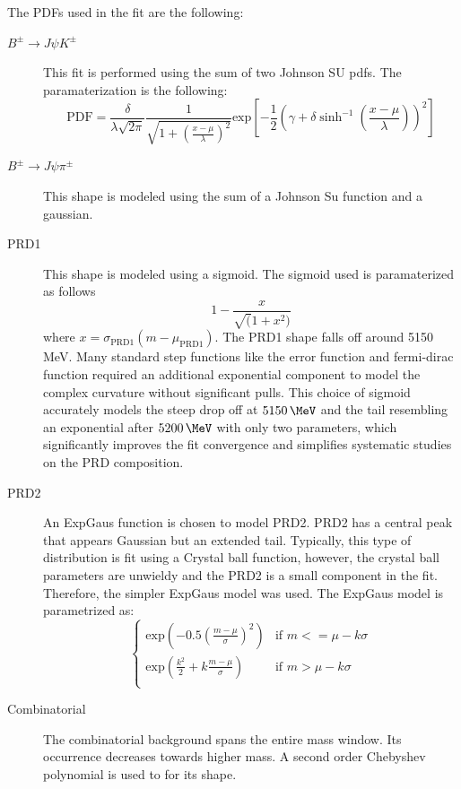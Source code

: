 The PDFs used in the fit are the following:
\begin{description}
\item [$B^{\pm}\to J\psi K^\pm$] This fit is performed using the sum of two Johnson SU pdfs. The paramaterization is the following: 
\begin{equation}
    \text{PDF} = \frac{\delta}{\lambda \sqrt{2\pi}} \frac{1}{\sqrt{1+(\frac{x-\mu}{\lambda})^2}} \text{exp}[-\frac{1}{2}(\gamma + \delta \sinh ^{-1}(\frac{x-\mu}{\lambda}))^2]
\end{equation}

\item[$B^{\pm}\to J\psi \pi^\pm$] This shape is modeled using the sum of a Johnson Su function and a gaussian. 

\item[PRD1] This shape is modeled using a sigmoid. The sigmoid used is paramaterized as follows
\begin{equation}
    1-\frac{x}{\sqrt(1+x^2)}%
\end{equation}
where $x = \sigma_{\text{PRD1}} (m-\mu_{\text{PRD1}})$. The PRD1 shape falls off around 5150 MeV. Many standard step functions like the error function and fermi-dirac function required an additional exponential component to model the complex curvature without significant pulls. This choice of sigmoid accurately models the steep drop off at $5150\,\MeV$ and the tail resembling an exponential after $5200\,\MeV$ with only two parameters, which significantly improves the fit convergence and simplifies systematic studies on the PRD composition. 

\item[PRD2] An ExpGaus \cite{expgauss} function is chosen to model PRD2. PRD2 has a central peak that appears Gaussian but an extended tail. Typically, this type of distribution is fit using a Crystal ball function, however, the crystal ball parameters are unwieldy and the PRD2 is a small component in the fit. Therefore, the simpler ExpGaus model was used. The ExpGaus model is parametrized as:
\begin{equation}
    \begin{cases}
        \text{exp}(-0.5(\frac{m-\mu}{\sigma})^2) & \text{if } m <= \mu-k\sigma \\
        \text{exp}(\frac{k^2}{2} + k\frac{m-\mu}{\sigma}) & \text{if } m > \mu-k\sigma \\
    \end{cases}
\end{equation}

\item [Combinatorial] The combinatorial background spans the entire mass window. Its occurrence decreases towards higher mass. A second order Chebyshev polynomial is used to for its shape. 
\end{description}

